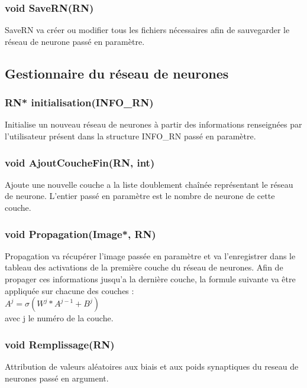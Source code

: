 \documentclass{article}
\begin{document}
		\subsubsection{\textcolor{myblue}{\textbf{void}} SaveRN(\textcolor{myblue}{\textbf{RN}})}
		SaveRN va créer ou modifier tous les fichiers nécessaires afin de sauvegarder le réseau de neurone passé en paramètre.
		
	
	\subsection{Gestionnaire du réseau de neurones}
		\subsubsection{\textcolor{myblue}{\textbf{RN*}} initialisation(\textcolor{myblue}{\textbf{INFO\_RN}})}
		Initialise un nouveau réseau de neurones à partir des informations renseignées par l'utilisateur présent dans la structure INFO\_RN passé en paramètre.
		
		\subsubsection{\textcolor{myblue}{\textbf{void}} AjoutCoucheFin(\textcolor{myblue}{\textbf{RN}}, \textcolor{myblue}{\textbf{int}})}
		Ajoute une nouvelle couche a la liste doublement chaînée représentant le réseau de neurone. L'entier passé en paramètre est le nombre de neurone de cette couche.
		
		\subsubsection{\textcolor{myblue}{\textbf{void}} Propagation(\textcolor{myblue}{\textbf{Image*}}, \textcolor{myblue}{\textbf{RN}})}
		Propagation va récupérer l'image passée en paramètre et va l'enregistrer dans le tableau des activations de la première couche du réseau de neurones. Afin de propager ces informations jusqu'a la dernière couche, la formule suivante va être appliquée sur chacune des couches :\\ $A^j = \sigma(W^j*A^{j-1}+B^j)$\\
		avec j le numéro de la couche.
		
		\subsubsection{\textcolor{myblue}{\textbf{void}} Remplissage(\textcolor{myblue}{\textbf{RN}})}
		Attribution de valeurs aléatoires aux biais et aux poids synaptiques du reseau de neurones passé en argument.
		
\end{document}
